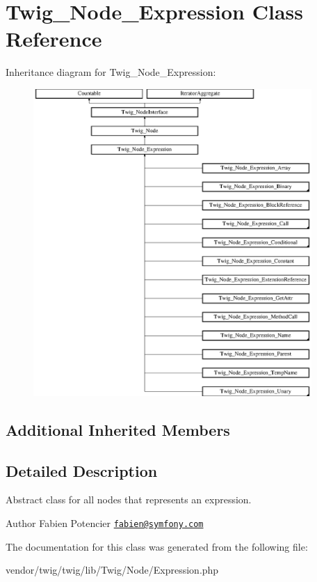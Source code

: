\hypertarget{classTwig__Node__Expression}{}\section{Twig\+\_\+\+Node\+\_\+\+Expression Class Reference}
\label{classTwig__Node__Expression}
Inheritance diagram for Twig\+\_\+\+Node\+\_\+\+Expression\+:\begin{figure}[H]
\begin{center}
\leavevmode
\includegraphics[height=11.666667cm]{classTwig__Node__Expression}
\end{center}
\end{figure}
\subsection*{Additional Inherited Members}


\subsection{Detailed Description}
Abstract class for all nodes that represents an expression.

\begin{DoxyAuthor}{Author}
Fabien Potencier \href{mailto:fabien@symfony.com}{\tt fabien@symfony.\+com} 
\end{DoxyAuthor}


The documentation for this class was generated from the following file\+:\begin{DoxyCompactItemize}
\item 
vendor/twig/twig/lib/\+Twig/\+Node/Expression.\+php\end{DoxyCompactItemize}
